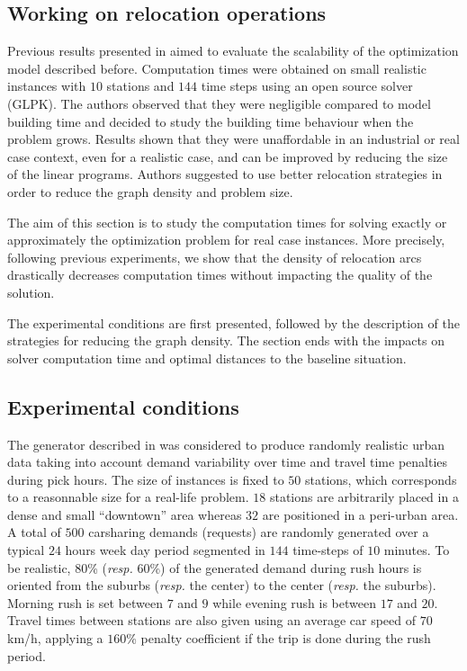 \begin{bibunit}[ieeetr]
\newpage
\section{Working on relocation operations}
Previous results presented in \cite{carlier2014} aimed to evaluate the scalability of the optimization model described before.
Computation times were obtained on small realistic instances with $10$ stations and $144$ time steps using an open source solver (GLPK).
The authors observed that they were negligible compared to model building time and decided to study the building time behaviour when the problem grows.
Results shown that they were unaffordable in an industrial or real case context, even for a realistic case, and can be improved by reducing the size of the linear programs.
Authors suggested to use better relocation strategies in order to reduce the graph density and problem size.

The aim of this section is to study the computation times for solving exactly or approximately the optimization problem for real case instances.
More precisely, following previous experiments, we show that the density of relocation arcs drastically decreases computation times without impacting the quality of the solution.

The experimental conditions are first presented, followed by the description of the strategies for reducing the graph density.
The section ends with the impacts on solver computation time and optimal distances to the baseline situation. 

\subsection{Experimental conditions}
The generator described in \cite{carlier2014} was considered to produce randomly realistic urban data taking into account demand variability over time and travel time penalties during pick hours.
The size of instances is fixed to $50$ stations, which corresponds to a reasonnable size for a real-life problem.
$18$ stations are arbitrarily placed in a dense and small ``downtown'' area whereas $32$ are positioned in a peri-urban area. 
A total of $500$ carsharing demands (requests) are randomly generated over a typical $24$ hours week day period segmented in $144$ time-steps of $10$ minutes. 
To be realistic, $80$\% ({\em resp.} $60$\%) of the generated demand during rush hours is oriented from the suburbs ({\em resp.} the center) to the center ({\em resp.} the suburbs). 
Morning rush is set between $7$ and $9$ while evening rush is between $17$ and $20$. 
Travel times between stations are also  given using an average car speed of $70$km/h, applying a $160$\% penalty coefficient if the trip is done during the rush period.


\end{bibunit}
